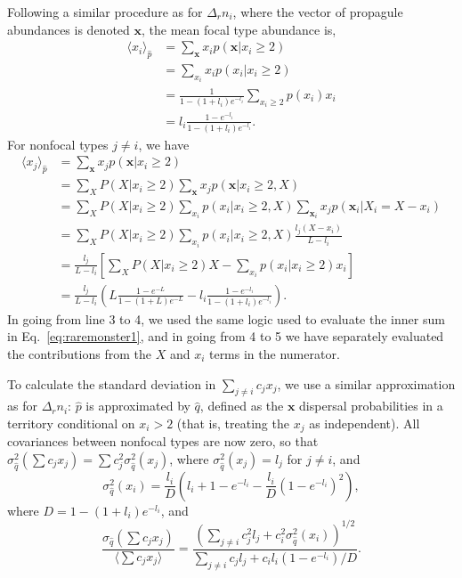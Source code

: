 \documentclass[12pt]{article}
\begin{document}
Following a similar procedure as for $\Delta_r n_i$, where the vector of propagule abundances is denoted ${\mathbf x}$, the mean focal type abundance is, 
\begin{align}
\langle x_i \rangle_{\hat{p}}&=\sum_{\mathbf x} x_i p(\mathbf x|x_i\geq 2)\nonumber \\
&=\sum_{x_i} x_i p(x_i|x_i\geq 2) \nonumber\\
&=\frac{1}{1-(1+l_i)e^{-l_i}}\sum_{x_i\geq 2} p(x_i)x_i\nonumber\\
&=l_i\frac{1-e^{-l_i}}{1-(1+l_i)e^{-l_i}}.
\end{align}
For nonfocal types $j\neq i$, we have
\begin{align}
\langle x_j \rangle_{\hat{p}}&=\sum_{\mathbf x} x_j p(\mathbf x|x_i\geq 2)\nonumber \\
&=\sum_{X}P(X|x_i\geq 2)\sum_{\mathbf x} x_j p({\mathbf x}|x_i\geq 2,X)\nonumber\\
&=\sum_{X}P(X|x_i\geq 2)\sum_{x_i} p(x_i|x_i\geq 2,X) \sum_{\mathbf x_i} x_j p(\mathbf x_i|X_i=X-x_i)\nonumber\\
&=\sum_{X}P(X|x_i\geq 2)\sum_{x_i}p(x_i|x_i\geq 2,X) \frac{l_j(X-x_i)}{L-l_i} \nonumber\\
&=\frac{l_j}{L-l_i}\left[\sum_{X}P(X|x_i\geq 2)X - \sum_{x_i}p(x_i|x_i\geq 2) x_i \right]\nonumber\\
&=\frac{l_j}{L-l_i}\left( L\frac{1-e^{-L}}{1-(1+L)e^{-L}}- l_i\frac{1-e^{-l_i}}{1-(1+l_i)e^{-l_i}}\right).
\end{align}
In going from line 3 to 4, we used the same logic used to evaluate the inner sum in Eq.~\eqref{eq:raremonster1}, and in going from 4 to 5 we have separately evaluated the contributions from the $X$ and $x_i$ terms in the numerator.

To calculate the standard deviation in $\sum_{j\neq i} c_j x_j$, we use a similar approximation as for $\Delta_r n_i$: $\hat{p}$ is approximated by $\hat{q}$, defined as the ${\mathbf x}$ dispersal probabilities in a territory conditional on $x_i>2$ (that is, treating the $x_j$ as independent). All covariances between nonfocal types are now zero, so that $\sigma_{\hat{q}}^2(\sum c_j x_j)=\sum c_j^2 \sigma_{\hat{q}}^2(x_j)$, where $\sigma_{\hat{q}}^2(x_j)=l_j$ for $j\neq i$, and  
\begin{equation}
\sigma_{\hat{q}}^2(x_i)=\frac{l_i}{D}\left(l_i+1-e^{-l_i}-\frac{l_i}{D}\left(1-e^{-l_i}\right)^2\right),
\end{equation}
where $D= 1-(1+l_i)e^{-l_i}$, and 
\begin{equation}
\frac{\sigma_{\hat{q}}(\sum c_j x_j)}{\langle\sum c_j x_j\rangle} = \frac{\left(\sum_{j\neq i} c_j^2 l_j + c_i^2 \sigma_{\hat{q}}^2(x_i)\right)^{1/2}}{\sum_{j\neq i} c_j l_j + c_i l_i (1-e^{-l_i})/D} \label{eq:cva}.
\end{equation}
\end{document}
